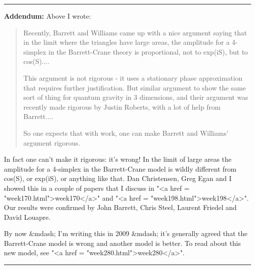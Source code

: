  \par\noindent\rule{\textwidth}{0.4pt}
\textbf{Addendum:} Above I wrote:

\begin{quote}
Recently, Barrett and Williams
came up with a nice argument saying that in the limit
where the triangles have large areas, the amplitude for a 4-simplex in
the Barrett-Crane theory is proportional, not to exp(iS), but to cos(S)....

This argument is not rigorous - it uses a stationary phase approximation
that requires further justification. But  
similar argument to show the same sort of thing for quantum gravity in 3
dimensions, and their argument was recently made rigorous by Justin
Roberts, with a lot of help from Barrett....

So one expects that with work, one can make Barrett and Williams' 
argument rigorous.
\end{quote}

In fact one can't make it rigorous: it's wrong!  In the limit of large
areas the amplitude for a 4-simplex in the Barrett-Crane model is
wildly different from cos(S), or exp(iS), or anything like that.  Dan
Christensen, Greg Egan and I showed this in a couple of papers that I
discuss in "<a href = "week170.html">week170</a>" and
"<a href = "week198.html">week198</a>".  Our results were
confirmed by John Barrett, Chris Steel, Laurent Friedel and David
Louapre.  

By now &mdash; I'm writing this in 2009 &mdash; it's
generally agreed that the Barrett-Crane model is wrong and another
model is better.  To read about this new model, see "<a href =
"week280.html">week280</a>".



 \par\noindent\rule{\textwidth}{0.4pt}

